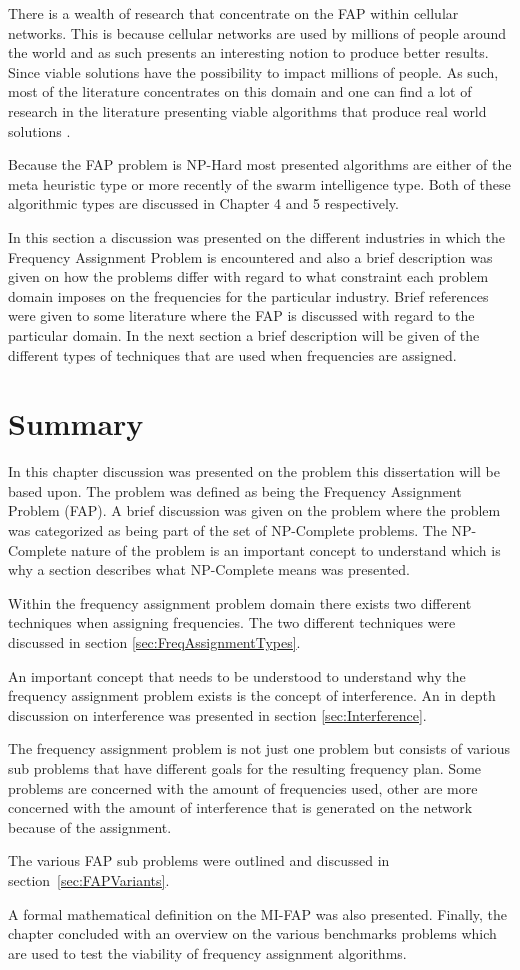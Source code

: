 There is a wealth of research that concentrate on the FAP within cellular networks. This is because cellular networks are used by millions of people around the world and as such presents an interesting notion to produce better results. Since viable solutions have the possibility to impact millions of people. As such, most of the literature concentrates on this domain and one can find a lot of research in the literature presenting viable algorithms that produce real world solutions \cite{Eisenblatter}. 

Because the FAP problem is NP-Hard most presented algorithms are either of the meta heuristic type or more recently of the swarm intelligence type. Both of these algorithmic types are discussed in Chapter 4 and 5 respectively.

In this section a discussion was presented on the different industries in which the Frequency Assignment Problem is encountered and also a brief description was given on how the problems differ with regard to what constraint each problem domain imposes on the frequencies for the particular industry. 
Brief references were given to some literature where the FAP is discussed with regard to the particular domain. In the next section a brief description will be given of the different types of techniques that are used when frequencies are assigned.
\section{Summary}
In this chapter discussion was presented on the problem this dissertation will be based upon. The problem was defined as being the Frequency Assignment Problem (FAP). A brief discussion was given on the problem where the problem was categorized as being part of the set of NP-Complete problems. The NP-Complete nature of the problem is an important concept to understand which is why a section describes what NP-Complete means was presented.

Within the frequency assignment problem domain there exists two different techniques when assigning frequencies. The two different techniques were discussed in section \ref{sec:FreqAssignmentTypes}. 

An important concept that needs to be understood to understand why the frequency assignment problem exists is the concept of interference. An in depth discussion on interference was presented in section \ref{sec:Interference}.

The frequency assignment problem is not just one problem but consists of various sub problems that have different goals for the resulting frequency plan. Some problems are concerned with the amount of frequencies used, other are more concerned with the amount of interference that is generated on the network because of the assignment.

The various FAP sub problems were outlined and discussed in section~\ref{sec:FAPVariants}.

A formal mathematical definition on the MI-FAP was also presented. Finally, the chapter concluded with an overview on the various benchmarks problems which are used to test the viability of frequency assignment algorithms.
